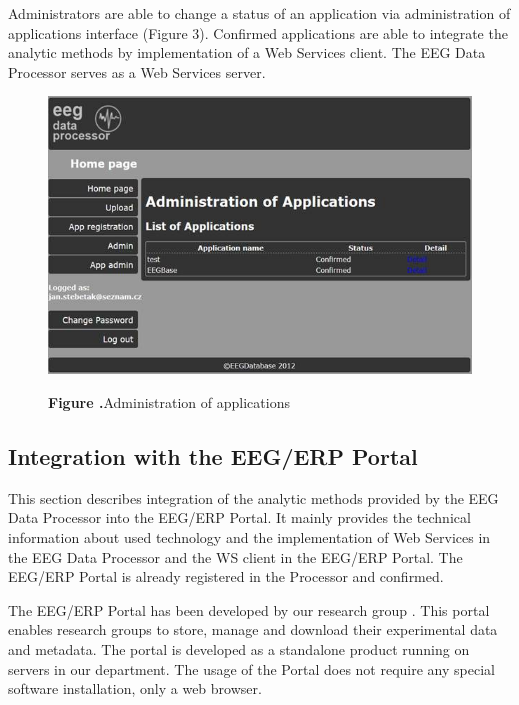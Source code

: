 \documentclass{frontiersSCNS} %
\begin{document}
Administrators are able to change a status of an application via administration of applications interface (Figure 3). Confirmed applications are able to integrate the analytic methods by implementation of a Web Services client. The EEG Data Processor serves as a Web Services server.

\begin{figure}
\begin{center}
\includegraphics[width=16cm]{edp02}%
\end{center}
\textbf{\label{fig:03} Figure .}{Administration of applications }
\end{figure}

\subsection{Integration with the EEG/ERP Portal}

This section describes integration of the analytic methods provided by the EEG Data Processor into the EEG/ERP Portal. It mainly provides the technical information about used technology and the implementation of Web Services in the EEG Data Processor and the WS client in the EEG/ERP Portal. The EEG/ERP Portal is already registered in the Processor and confirmed.

The EEG/ERP Portal has been developed by our research group \cite{Jezek10}. This portal enables research groups to store, manage and download their experimental data and metadata. The portal is developed as a standalone product running on servers in our department. The usage of the Portal does not require any special software installation, only a web browser.
\end{document}
